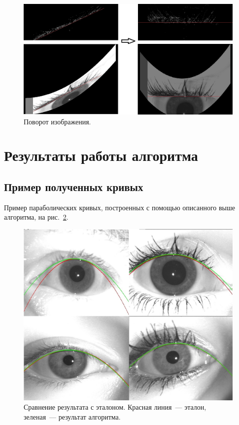 \documentclass[12pt,a4paper]{article} %
\begin{document}
\begin{figure}[h]
	
	\centering
	
	\includegraphics[width=0.8\linewidth]{nakl.jpg}
	
	\caption{Поворот изображения.}
	
	\label{fig:nakl}
	
\end{figure}



\newpage
\section{Результаты работы алгоритма}
\subsection{Пример полученных кривых}
Пример параболических кривых, построенных с помощью описанного выше алгоритма, на рис.~\ref{fig:compare}.
\begin{figure}[h]
	
	\centering
	
	\includegraphics[width=0.6\linewidth]{compare.jpg}
	
	\caption{Сравнение результата с эталоном. Красная линия~--- эталон, зеленая~--- результат алгоритма.}
	
	\label{fig:compare}
	
\end{figure}
\end{document}
